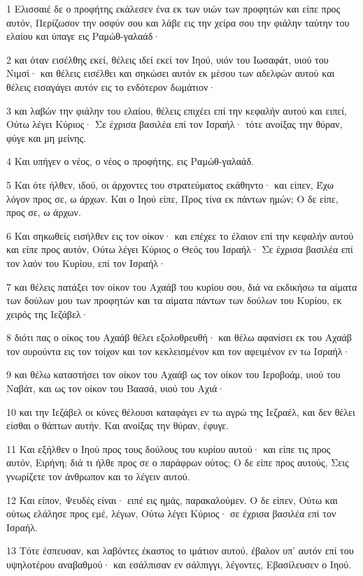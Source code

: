 \par 1 Ελισσαιέ δε ο προφήτης εκάλεσεν ένα εκ των υιών των προφητών και είπε προς αυτόν, Περίζωσον την οσφύν σου και λάβε εις την χείρα σου την φιάλην ταύτην του ελαίου και ύπαγε εις Ραμώθ-γαλαάδ·
\par 2 και όταν εισέλθης εκεί, θέλεις ιδεί εκεί τον Ιηού, υιόν του Ιωσαφάτ, υιού του Νιμσί· και θέλεις εισέλθει και σηκώσει αυτόν εκ μέσου των αδελφών αυτού και θέλεις εισαγάγει αυτόν εις το ενδότερον δωμάτιον·
\par 3 και λαβών την φιάλην του ελαίου, θέλεις επιχέει επί την κεφαλήν αυτού και ειπεί, Ούτω λέγει Κύριος· Σε έχρισα βασιλέα επί τον Ισραήλ· τότε ανοίξας την θύραν, φύγε και μη μείνης.
\par 4 Και υπήγεν ο νέος, ο νέος ο προφήτης, εις Ραμώθ-γαλαάδ.
\par 5 Και ότε ήλθεν, ιδού, οι άρχοντες του στρατεύματος εκάθηντο· και είπεν, Έχω λόγον προς σε, ω άρχων. Και ο Ιηού είπε, Προς τίνα εκ πάντων ημών; Ο δε είπε, προς σε, ω άρχων.
\par 6 Και σηκωθείς εισήλθεν εις τον οίκον· και επέχεε το έλαιον επί την κεφαλήν αυτού και είπε προς αυτόν, Ούτω λέγει Κύριος ο Θεός του Ισραήλ· Σε έχρισα βασιλέα επί τον λαόν του Κυρίου, επί τον Ισραήλ·
\par 7 και θέλεις πατάξει τον οίκον του Αχαάβ του κυρίου σου, διά να εκδικήσω τα αίματα των δούλων μου των προφητών και τα αίματα πάντων των δούλων του Κυρίου, εκ χειρός της Ιεζάβελ·
\par 8 διότι πας ο οίκος του Αχαάβ θέλει εξολοθρευθή· και θέλω αφανίσει εκ του Αχαάβ τον ουρούντα εις τον τοίχον και τον κεκλεισμένον και τον αφειμένον εν τω Ισραήλ·
\par 9 και θέλω καταστήσει τον οίκον του Αχαάβ ως τον οίκον του Ιεροβοάμ, υιού του Ναβάτ, και ως τον οίκον του Βαασά, υιού του Αχιά·
\par 10 και την Ιεζάβελ οι κύνες θέλουσι καταφάγει εν τω αγρώ της Ιεζραέλ, και δεν θέλει είσθαι ο θάπτων αυτήν. Και ανοίξας την θύραν, έφυγε.
\par 11 Και εξήλθεν ο Ιηού προς τους δούλους του κυρίου αυτού· και είπε τις προς αυτόν, Ειρήνη; διά τι ήλθε προς σε ο παράφρων ούτος; Ο δε είπε προς αυτούς, Σεις γνωρίζετε τον άνθρωπον και το λέγειν αυτού.
\par 12 Και είπον, Ψευδές είναι· ειπέ εις ημάς, παρακαλούμεν. Ο δε είπεν, Ούτω και ούτως ελάλησε προς εμέ, λέγων, Ούτω λέγει Κύριος· σε έχρισα βασιλέα επί τον Ισραήλ.
\par 13 Τότε έσπευσαν, και λαβόντες έκαστος το ιμάτιον αυτού, έβαλον υπ' αυτόν επί του υψηλοτέρου αναβαθμού· και εσάλπισαν εν σάλπιγγι, λέγοντες, Εβασίλευσεν ο Ιηού.
